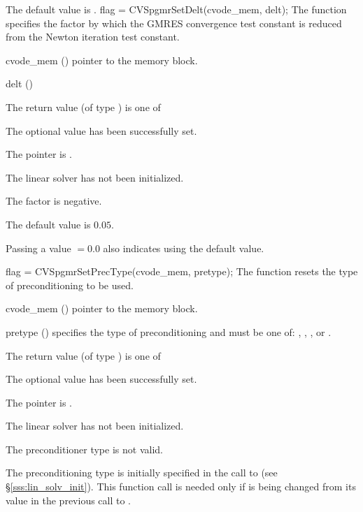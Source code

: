 {
  The default value is .
}
{
  flag = CVSpgmrSetDelt(cvode\_mem, delt);
}
{
  The function  specifies the factor by
  which the GMRES convergence test constant is reduced
  from the Newton iteration test constant.
}
{
  \begin{args}
  \item[cvode\_mem] ()
    pointer to the {\cvode} memory block.
  \item[delt] ()

  \end{args}
}
{
  The return value  (of type ) is one of
  \begin{args}
  \item[\Id{CVSPGMR\_SUCCESS}] 
    The optional value has been successfully set.
  \item[\Id{CVSPGMR\_MEM\_NULL}]
    The  pointer is .
  \item[\Id{CVSPGMR\_LMEM\_NULL}]
    The {\cvspgmr} linear solver has not been initialized.
  \item[\Id{CVSPGMR\_ILL\_INPUT}]
    The factor  is negative.  
  \end{args}
}
{
  The default value is $0.05$.

  Passing a value $ = 0.0$ also indicates using the default value.
}
{
  flag = CVSpgmrSetPrecType(cvode\_mem, pretype);
}
{
  The function  resets the type
  of preconditioning to be used.
}
{
  \begin{args}
  \item[cvode\_mem] ()
    pointer to the {\cvode} memory block.
  \item[pretype] ()
    specifies the type of preconditioning and must be one of:
    , , , or .
  \end{args}
}
{
  The return value  (of type ) is one of
  \begin{args}
  \item[\Id{CVSPGMR\_SUCCESS}] 
    The optional value has been successfully set.
  \item[\Id{CVSPGMR\_MEM\_NULL}]
    The  pointer is .
  \item[\Id{CVSPGMR\_LMEM\_NULL}]
    The {\cvspgmr} linear solver has not been initialized.
  \item[\Id{CVSPGMR\_ILL\_INPUT}]
    The preconditioner type  is not valid.
  \end{args}
}
{
  The preconditioning type is initially specified in the call
  to  (see \S\ref{sss:lin_solv_init}). This function call is
  needed only if  is being changed from its value in the
  previous call to .
}

